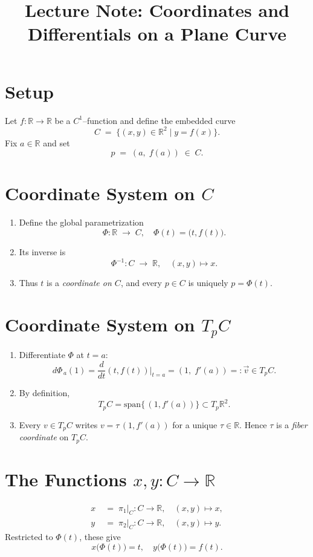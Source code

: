 \documentclass[12pt]{article}
\title{Lecture Note: Coordinates and Differentials on a Plane Curve}
\author{}
\date{}
\numberwithin{equation}{section}
\begin{document}
	\maketitle
	
	\section{Setup}
	Let \(f\colon \mathbb{R}\to\mathbb{R}\) be a \(C^1\)--function and define the embedded curve
	\[
	C \;=\;\bigl\{(x,y)\in\mathbb{R}^2 \mid y = f(x)\bigr\}.
	\]
	Fix \(a\in\mathbb{R}\) and set
	\[
	p \;=\;(a,\;f(a)) \;\in\; C.
	\]
	
	\section{Coordinate System on \(C\)}
	\begin{enumerate}
		\item Define the global parametrization
		\[
		\Phi\colon \mathbb{R}\;\longrightarrow\;C,\quad
		\Phi(t)=\bigl(t,f(t)\bigr).
		\]
		\item Its inverse is
		\[
		\Phi^{-1}\colon C\;\longrightarrow\;\mathbb{R},
		\quad
		(x,y)\mapsto x.
		\]
		\item Thus \(t\) is a \emph{coordinate on \(C\)}, and every \(p\in C\) is uniquely
		\(p=\Phi(t)\).
	\end{enumerate}
	
	\section{Coordinate System on \(T_pC\)}
	\begin{enumerate}
		\item Differentiate \(\Phi\) at \(t=a\):
		\[
		d\Phi_{\,a}(1)
		=\frac{d}{dt}(t,f(t))\bigg|_{t=a}
		=(1,\;f'(a))
		=:\vec v\in T_pC.
		\]
		\item By definition,
		\[
		T_pC
		=\mathrm{span}\{\,(1,f'(a))\}
		\subset T_{p}\mathbb{R}^2.
		\]
		\item Every \(v\in T_pC\) writes \(v=\tau\,(1,f'(a))\) for a unique
		\(\tau\in\mathbb{R}\).  Hence \(\tau\) is a \emph{fiber coordinate} on \(T_pC\).
	\end{enumerate}
	
	\section{The Functions \(x,y\colon C\to\mathbb{R}\)}
	\begin{align*}
		x\;&=\;\pi_1\bigl|_C\colon C\to\mathbb{R},\quad (x,y)\mapsto x,\\
		y\;&=\;\pi_2\bigl|_C\colon C\to\mathbb{R},\quad (x,y)\mapsto y.
	\end{align*}
	Restricted to \(\Phi(t)\), these give
	\[
	x\bigl(\Phi(t)\bigr)=t,
	\quad
	y\bigl(\Phi(t)\bigr)=f(t).
	\]
	
\end{document}
